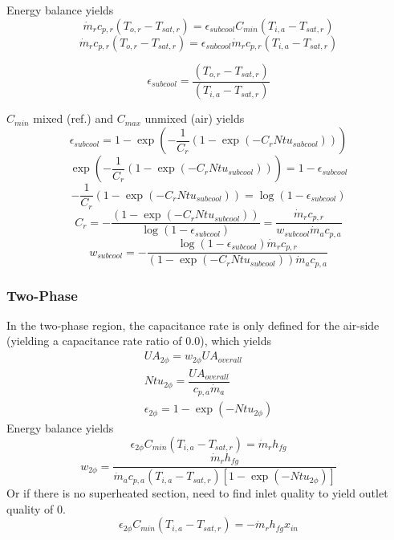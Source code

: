 \documentclass[]{article}
\begin{document}
Energy balance yields
\begin{equation}
\dot m_rc_{p,r}(T_{o,r}-T_{sat,r})=\epsilon_{subcool} C_{min} (T_{i,a}-T_{sat,r})
\end{equation}
\begin{equation}
\dot m_rc_{p,r}(T_{o,r}-T_{sat,r})=\epsilon_{subcool}\dot m_rc_{p,r} (T_{i,a}-T_{sat,r})
\end{equation}

\begin{equation}
\epsilon_{subcool}=\frac{(T_{o,r}-T_{sat,r})}{(T_{i,a}-T_{sat,r})}
\end{equation}

$C_{min}$ mixed (ref.) and $C_{max}$ unmixed (air) yields
\begin{equation}
\epsilon_{subcool} = 1 - \exp(-\displaystyle\frac{1}{C_r}  (1 - \exp(-C_r Ntu_{subcool})))
\end{equation}
\begin{equation}
\exp(-\displaystyle\frac{1}{C_r}  (1 - \exp(-C_r Ntu_{subcool})))  = 1 - \epsilon_{subcool}
\end{equation}
\begin{equation}
-\dfrac{1}{C_r}  (1 - \exp(-C_r Ntu_{subcool}))  = \log(1 - \epsilon_{subcool})
\end{equation}
\begin{equation}
{C_r}=-\frac{ (1 - \exp(-C_r Ntu_{subcool}))}{\log(1 - \epsilon_{subcool})}=\frac{\dot m_r c_{p,r}}{w_{subcool}\dot m_{a} c_{p,a}}
\end{equation}
\begin{equation}
w_{subcool}=-\frac{\log(1 - \epsilon_{subcool})\dot m_r c_{p,r}}{ (1 - \exp(-C_r Ntu_{subcool}))\dot m_{a} c_{p,a}}
\end{equation}


\subsubsection{Two-Phase}
In the two-phase region, the capacitance rate is only defined for the air-side (yielding a capacitance rate ratio of 0.0), which yields
\begin{equation}
\begin{array}{l}
UA_{2\phi} = w_{2\phi}UA_{overall}\\
Ntu_{2\phi} = \dfrac{UA_{overall} }{c_{p,a}  \dot m_{a}}\\
\epsilon_{2\phi} = 1-\exp(-Ntu_{2\phi})
\end{array}
\end{equation}
Energy balance yields
\begin{equation}
\epsilon_{2\phi}C_{min}(T_{i,a}-T_{sat,r})=\dot m_r h_{fg}
\end{equation}
\begin{equation}
w_{2\phi}=\frac{\dot m_r h_{fg}}{\dot m_a c_{p,a}(T_{i,a}-T_{sat,r})[1-\exp(-Ntu_{2\phi})]}
\end{equation}
Or if there is no superheated section, need to find inlet quality to yield outlet quality of 0.
\begin{equation}
\epsilon_{2\phi}C_{min}(T_{i,a}-T_{sat,r})=-\dot m_r h_{fg}x_{in}
\end{equation}
\end{document}
